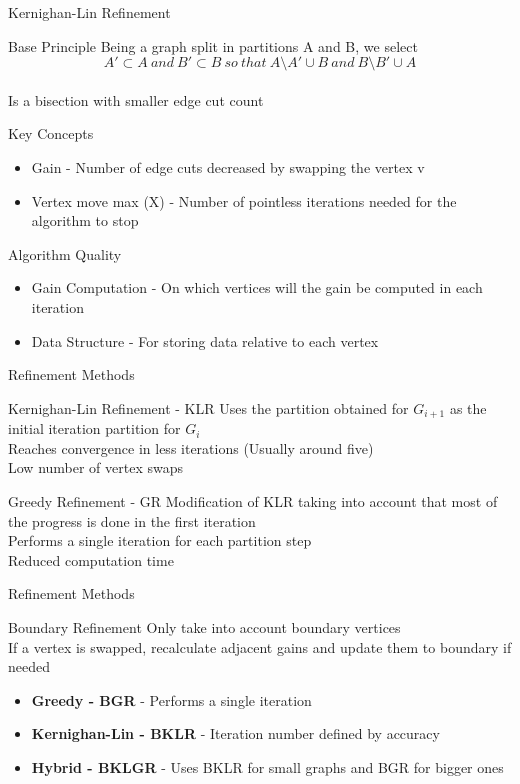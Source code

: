 \documentclass{beamer}
\begin{document}
	\begin{frame}{Kernighan-Lin Refinement}
		\begin{block}{Base Principle}
			Being a graph split in partitions A and B, we select
			\[A'\subset A~and~B'\subset B~so~that~A\setminus A'\cup B~and~B\setminus B'\cup A\]\\
			Is a bisection with smaller edge cut count
		\end{block}
		\begin{block}{Key Concepts}
			\begin{itemize}
				\item Gain - Number of edge cuts decreased by swapping the vertex v
				\item Vertex move max (X) - Number of pointless iterations needed for the algorithm to stop
			\end{itemize}
		\end{block}
		\begin{block}{Algorithm Quality}
			\begin{itemize}
				\item Gain Computation - On which vertices will the gain be computed in each iteration
				\item Data Structure - For storing data relative to each vertex
			\end{itemize}
		\end{block}
	\end{frame}
	\begin{frame}{Refinement Methods}
		\begin{block}{Kernighan-Lin Refinement - KLR}
			Uses the partition obtained for \(G_{i+1}\) as the initial iteration partition for \(G_{i}\)\\
			Reaches convergence in less iterations (Usually around five)\\
			Low number of vertex swaps
		\end{block}
		\begin{block}{Greedy Refinement - GR}
			Modification of KLR taking into account that most of the progress is done in the first iteration\\
			Performs a single iteration for each partition step\\
			Reduced computation time
		\end{block}
	\end{frame}
	\begin{frame}{Refinement Methods}	
		\begin{block}{Boundary Refinement}
			Only take into account boundary vertices\\
			If a vertex is swapped, recalculate adjacent gains and update them to boundary if needed		
			\begin{itemize}
				\item \textbf{Greedy - BGR} - Performs a single iteration
				\item \textbf{Kernighan-Lin - BKLR} - Iteration number defined by accuracy
				\item \textbf{Hybrid - BKLGR} - Uses BKLR for small graphs and BGR for bigger ones
			\end{itemize}
		\end{block}
	\end{frame}
\end{document}
